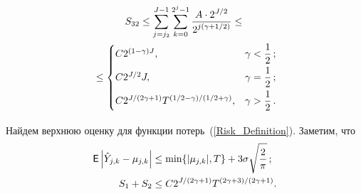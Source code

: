 \begin{multicols}{2}
\noindent
\begin{multline}
S_{32}\leq\sum\limits_{j=j_2}^{J-1}\sum\limits_{k=0}^{2^j-1}
\displaystyle\frac{\displaystyle A\cdot 2^{J/2}\mathstrut}{\displaystyle 2^{j\left(\gamma+1/2\right)}\mathstrut}\leq {}\\
{}\leq
\begin{cases}
C2^{(1-\gamma)J}, & \gamma<\displaystyle\frac{\displaystyle 1\mathstrut}{\displaystyle 2\mathstrut}\,;\\
C 2^{J/2}J, & \gamma=\displaystyle\frac{\displaystyle 1\mathstrut}{\displaystyle 2\mathstrut}\,;\\
C2^{{J}/({2\gamma+1})}T^{({1/2-\gamma})/({1/2+\gamma})}, & \gamma>\displaystyle\frac{\displaystyle 1\mathstrut}{\displaystyle 2\mathstrut}\,.
\end{cases}
\label{S32_Upper_Bound}
\end{multline}

Найдем верхнюю оценку для функции потерь~(\ref{Risk_Definition}). Заметим, что
\begin{align}
\label{Term_Bound}
{\sf E}\left|\hat{Y}_{j,k}-\mu_{j,k}\right|&\leq \min\{|\mu_{j,k}|,T\}+3\sigma\sqrt{\displaystyle\frac{\displaystyle 2\mathstrut}{\displaystyle \pi\mathstrut}}\,;
\\
\label{S1S2_Order_Hard}
S_1+S_2&\leq C2^{{J}/({2\gamma+1})}T^{({2\gamma+3})/({2\gamma+1})}.
\end{align}


\end{multicols}

